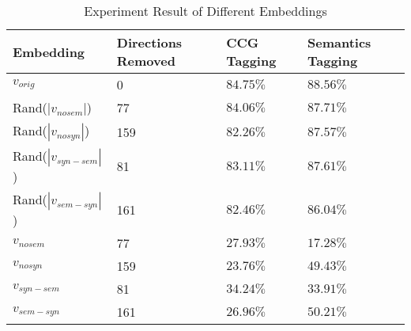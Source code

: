 \documentclass[11pt,a4paper]{article}
\begin{document}
\begin{table*}[h]
    \centering
    \begin{tabular}{llll}
    \hline
    \textbf{Embedding} & \textbf{Directions Removed} & \textbf{CCG Tagging} &\textbf{Semantics Tagging} \\
    \hline
    $v_{orig}$ & 0 & $84.75\%$ & $88.56\%$ \\
    \hline

    Rand($|v_{nosem}|$) & 77 & $84.06\%$ & $87.71\%$ \\
    Rand($|v_{nosyn}|$) & 159 & $82.26\%$ & $87.57\%$ \\
    Rand($|v_{syn-sem}|$) & 81 & $83.11\%$ & $87.61\%$ \\
    Rand($|v_{sem-syn}|$) & 161 & $82.46\%$ & $86.04\%$ \\
    \hline
    $v_{nosem}$ & 77 & $27.93\%$ & $17.28\%$ \\
    $v_{nosyn}$ & 159 & $23.76\%$ & $49.43\%$ \\
    $v_{syn-sem}$ & 81 & $34.24\%$ & $33.91\%$ \\
    $v_{sem-syn}$ & 161 & $26.96\%$ & $50.21\%$ \\
    \hline
    \hline
    \end{tabular}
    \caption{\label{role description} Experiment Result of Different Embeddings
    }
    \end{table*}

\end{document}
